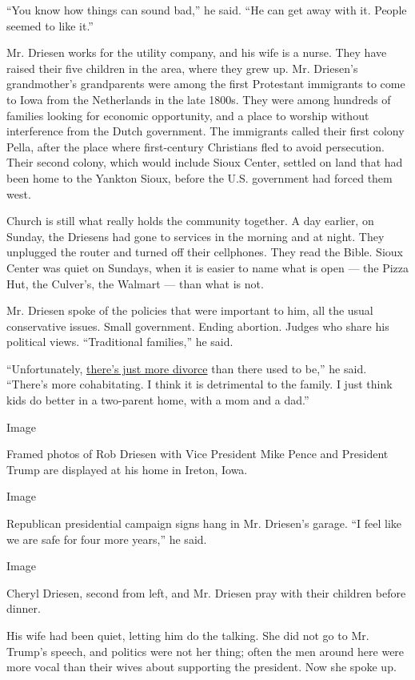 ``You know how things can sound bad,'' he said. ``He can get away with
it. People seemed to like it.''

Mr. Driesen works for the utility company, and his wife is a nurse. They
have raised their five children in the area, where they grew up. Mr.
Driesen's grandmother's grandparents were among the first Protestant
immigrants to come to Iowa from the Netherlands in the late 1800s. They
were among hundreds of families looking for economic opportunity, and a
place to worship without interference from the Dutch government. The
immigrants called their first colony Pella, after the place where
first-century Christians fled to avoid persecution. Their second colony,
which would include Sioux Center, settled on land that had been home to
the Yankton Sioux, before the U.S. government had forced them west.

Church is still what really holds the community together. A day earlier,
on Sunday, the Driesens had gone to services in the morning and at
night. They unplugged the router and turned off their cellphones. They
read the Bible. Sioux Center was quiet on Sundays, when it is easier to
name what is open --- the Pizza Hut, the Culver's, the Walmart --- than
what is not.

Mr. Driesen spoke of the policies that were important to him, all the
usual conservative issues. Small government. Ending abortion. Judges who
share his political views. ``Traditional families,'' he said.

``Unfortunately,
\href{https://www.nytimes3xbfgragh.onion/2011/03/24/us/24divorce.html}{there's
just more divorce} than there used to be,'' he said. ``There's more
cohabitating. I think it is detrimental to the family. I just think kids
do better in a two-parent home, with a mom and a dad.''

Image

Framed photos of Rob Driesen with Vice President Mike Pence and
President Trump are displayed at his home in Ireton, Iowa.

Image

Republican presidential campaign signs hang in Mr. Driesen's garage. ``I
feel like we are safe for four more years,'' he said.

Image

Cheryl Driesen, second from left, and Mr. Driesen pray with their
children before dinner.

His wife had been quiet, letting him do the talking. She did not go to
Mr. Trump's speech, and politics were not her thing; often the men
around here were more vocal than their wives about supporting the
president. Now she spoke up.


